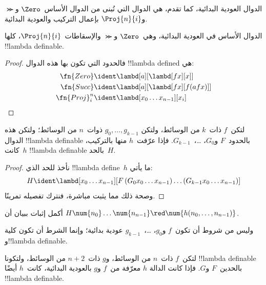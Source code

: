 \documentclass[../../../include/open-logic-section]{subfiles}
\begin{document}

الدوال العودية البدائية، كما تقدم، هي الدوال التي تُبنى من الدوال
الأساس~$\Zero$ و$\Succ$ و$\Proj{n}{i}$ بإعمال التركيب والعودية البدائية.

\begin{lem}
  الدوال الأساس في العودية البدائية، وهي~$\Zero$ و$\Succ$
  والإسقاطات~$\Proj{n}{i}$، كلها !!{lambda definable}.
\end{lem}

\begin{proof}
فالحدود التي تكون بها هذه الدوال !!{lambda defined} هي:
\begin{align*}
  \fn{Zero} & \ident \lambd[a][\lambd[fx][x]]\\
  \fn{Succ} & \ident \lambd[a][\lambd[fx][f (a f x)]] \\
  \fn{Proj}^n_i & \ident \lambd[x_0\dots x_{n-1}][x_i]
\end{align*}
\end{proof}

\begin{lem}
   لتكن~$f$ ذات~$k$ من الوسائط، ولتكن
  $g_0, \dots, g_{k-1}$ ذوات~$n$ من الوسائط؛ ولتكن هذه الدوال
  !!{lambda definable} بالحدود~$F$ و$G_0$، \dots،~$G_{k-1}$.
  فإذا عرّفت~$h$ منها بالتركيب، كانت~$h$ !!{lambda definable}
  بالحد~$H$.
\end{lem}

\begin{proof}
  نأخذ للحد الذي !!{lambda define}~$h$ ما يأتي:
  \[
  H \ident \lambd[x_0 \dots x_{n-1}][F\, (G_0 x_0 \dots
    x_{n-1}) \dots (G_{k-1} x_0 \dots x_{n-1})]
  \]
  وصحة ذلك مما يثبت مباشرة، فنترك تفصيله تمرينًا.
\end{proof}

\begin{prob}
  أكمل إثبات  ببيان أن
  $H\num{n_0}\dots\num{n_{n-1}} \red \num{h(n_0, \dots,
    n_{n-1})}$.
\end{prob}

وليس من شروط  أن تكون~$f$ و$g_0$،
\dots،~$g_{k-1}$ عودية بدائية؛ وإنما الشرط أن تكون كلية
و!!{lambda definable}.

\begin{lem}
  لتكن~$f$ ذات~$n$ من الوسائط، و$g$ ذات~$n+2$ من الوسائط،
  ولتكونا !!{lambda definable} بالحدين~$F$ و$G$. فإذا كانت الدالة
  $h$ معرّفة من~$f$ و$g$ بالعودية البدائية، كانت~$h$ أيضًا
  !!{lambda definable}.
\end{lem}
\end{document}
